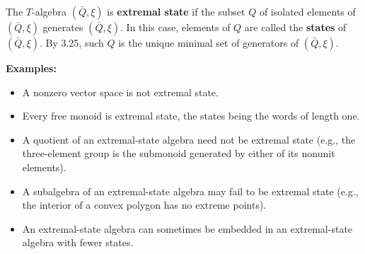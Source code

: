 The $T$-algebra $(\bar{Q}, \xi)$ is \textbf{extremal state} if the subset $Q$ of isolated elements of $(\bar{Q}, \xi)$ generates $(\bar{Q}, \xi)$. In this case, elements of $Q$ are called the \textbf{states} of $(\bar{Q}, \xi)$. By 3.25, such $Q$ is the unique minimal set of generators of $(\bar{Q}, \xi)$.

\textbf{Examples:}
\begin{itemize}
\item A nonzero vector space is not extremal state.
\item Every free monoid is extremal state, the states being the words of length one.
\item A quotient of an extremal-state algebra need not be extremal state (e.g., the three-element group is the submonoid generated by either of its nonunit elements).
\item A subalgebra of an extremal-state algebra may fail to be extremal state (e.g., the interior of a convex polygon has no extreme points).
\item An extremal-state algebra can sometimes be embedded in an extremal-state algebra with fewer states.
\end{itemize}
